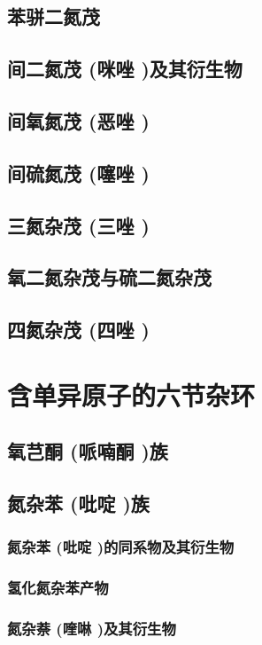 \documentclass[UTF8]{../03-Chemistry}
\begin{document}
    \subsection{苯骈二氮茂}
    \subsection{间二氮茂 (咪唑 )及其衍生物}
    \subsection{间氧氮茂 (恶唑 )}
    \subsection{间硫氮茂 (噻唑 )}
    \subsection{三氮杂茂 (三唑 )}
    \subsection{氧二氮杂茂与硫二氮杂茂}
    \subsection{四氮杂茂 (四唑 )}

\section{含单异原子的六节杂环}
    \subsection{氧芑酮 (哌喃酮 )族}
    \subsection{氮杂苯 (吡啶 )族}
        \subsubsection{氮杂苯 (吡啶 )的同系物及其衍生物}
        \subsubsection{氢化氮杂苯产物}
        \subsubsection{氮杂萘 (喹啉 )及其衍生物}
\end{document}
